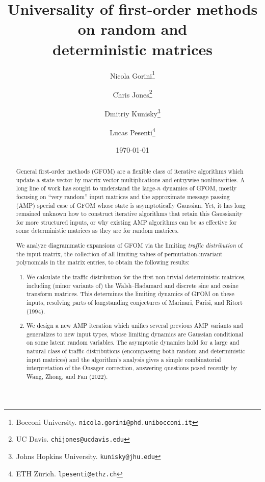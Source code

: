 \documentclass[11pt]{article}
\title{Universality of first-order methods on random and \\ deterministic matrices}
\author{Nicola Gorini\thanks{Bocconi University. \texttt{nicola.gorini@phd.unibocconi.it}}
\and Chris Jones\thanks{UC Davis. \texttt{chijones@ucdavis.edu}}
\and Dmitriy Kunisky\thanks{Johns Hopkins University. \texttt{kunisky@jhu.edu}}
\and Lucas Pesenti\thanks{ETH Z{\"u}rich. \texttt{lpesenti@ethz.ch}}}
\date{\today}
\begin{document}
\maketitle
\thispagestyle{empty}

\begin{abstract}
    General first-order methods (GFOM) are a flexible class of iterative algorithms which update a state vector by matrix-vector multiplications and entrywise nonlinearities.
    A long line of work has sought to understand the large-$n$ dynamics of GFOM, mostly focusing on ``very random'' input matrices and the approximate message passing (AMP) special case of GFOM whose state is asymptotically Gaussian.
    Yet, it has long remained unknown how to construct iterative algorithms that retain this Gaussianity for more structured inputs, or why existing AMP algorithms can be as effective for some deterministic matrices as they are for random matrices.
    
    We analyze diagrammatic expansions of GFOM via the limiting \emph{traffic distribution} of the input matrix, the collection of all limiting values of permutation-invariant polynomials in the matrix entries, to obtain the following results:
    \begin{enumerate}
    \item We calculate the traffic distribution for the first non-trivial deterministic matrices,
    including (minor variants of) the Walsh--Hadamard and discrete sine and cosine transform matrices.
    This determines the limiting dynamics of GFOM on these inputs, resolving parts of longstanding conjectures of Marinari, Parisi, and Ritort (1994).
    \item We design a new AMP iteration which unifies several previous AMP variants and generalizes to new input types,
    whose limiting dynamics are Gaussian conditional on some latent random variables.
    The asymptotic dynamics hold for a large and natural class of traffic distributions (encompassing both random and deterministic input matrices) and the algorithm's analysis gives a simple combinatorial interpretation of the Onsager correction, answering questions posed recently by Wang, Zhong, and Fan (2022).
    \end{enumerate}
\end{abstract}

\clearpage

\setcounter{tocdepth}{2}
\pagestyle{empty}
\tableofcontents

\clearpage
\end{document}
